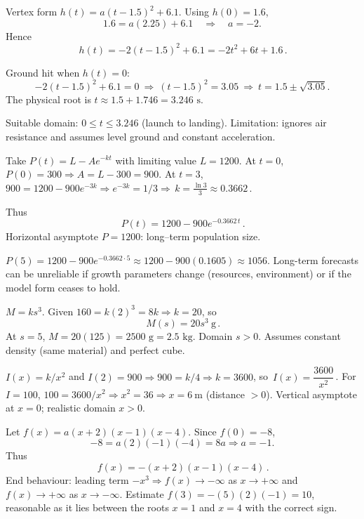 \documentclass[11pt]{article}
\begin{document}
\begin{solution}
Vertex form $h(t)=a(t-1.5)^2+6.1$. Using $h(0)=1.6$,
\[
1.6=a(2.25)+6.1 \quad\Rightarrow\quad a=-2.
\]
Hence
\[
\boxed{\,h(t)=-2(t-1.5)^2+6.1=-2t^2+6t+1.6\,}.
\]

Ground hit when $h(t)=0$:
\[
-2(t-1.5)^2+6.1=0\ \Rightarrow\ (t-1.5)^2=3.05\ \Rightarrow\ t=1.5\pm\sqrt{3.05}.
\]
The physical root is $t\approx 1.5+1.746=\boxed{3.246\text{ s}}$.

Suitable domain: $0\le t\le 3.246$ (launch to landing). Limitation: ignores air resistance and assumes level ground and constant acceleration.
\end{solution}

\begin{solution}
Take $P(t)=L-Ae^{-kt}$ with limiting value $L=1200$. At $t=0$, $P(0)=300\Rightarrow A=L-300=900$.
At $t=3$, $900=1200-900e^{-3k}\Rightarrow e^{-3k}=1/3\Rightarrow
\boxed{\,k=\frac{\ln 3}{3}\approx 0.3662\,}$.

Thus
\[
\boxed{\,P(t)=1200-900e^{-0.3662\,t}\,}.
\]
Horizontal asymptote $P=1200$: long–term population size.

$P(5)=1200-900e^{-0.3662\cdot 5}\approx 1200-900(0.1605)\approx \boxed{1056}$.
Long-term forecasts can be unreliable if growth parameters change (resources, environment) or if the model form ceases to hold.
\end{solution}

\begin{solution}
$M=ks^3$. Given $160=k(2)^3=8k\Rightarrow k=20$, so
\[
\boxed{\,M(s)=20s^3\ \text{g}\,}.
\]
At $s=5$, $M=20(125)=\boxed{2500\text{ g}}=2.5\text{ kg}$. Domain $s>0$. Assumes constant density (same material) and perfect cube.
\end{solution}

\begin{solution}
$I(x)=k/x^2$ and $I(2)=900\Rightarrow 900=k/4\Rightarrow \boxed{k=3600}$,
so $\boxed{\,I(x)=\dfrac{3600}{x^2}\,}$.
For $I=100$, $100=3600/x^2\Rightarrow x^2=36\Rightarrow \boxed{x=6\ \text{m}}$ (distance $>0$).
Vertical asymptote at $x=0$; realistic domain $x>0$.
\end{solution}

\begin{solution}
Let $f(x)=a(x+2)(x-1)(x-4)$. Since $f(0)=-8$,
\[
-8=a(2)(-1)(-4)=8a\Rightarrow a=-1.
\]
Thus
\[
\boxed{\,f(x)=-(x+2)(x-1)(x-4)\,}.
\]
End behaviour: leading term $-x^3\Rightarrow f(x)\to -\infty$ as $x\to +\infty$ and $f(x)\to +\infty$ as $x\to -\infty$.
Estimate $f(3)=-(5)(2)(-1)=\boxed{10}$, reasonable as it lies between the roots $x=1$ and $x=4$ with the correct sign.
\end{solution}
\end{document}
